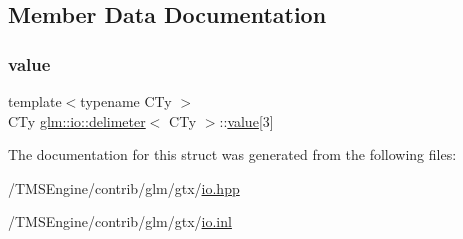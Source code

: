 \subsection{Member Data Documentation}
\mbox{\label{structglm_1_1io_1_1delimeter_a9ade129dae50c4f716f724e7425f9c68}} 
\subsubsection{\texorpdfstring{value}{value}}
{\footnotesize\ttfamily template$<$typename C\+Ty $>$ \\
C\+Ty \hyperlink{structglm_1_1io_1_1delimeter}{glm\+::io\+::delimeter}$<$ C\+Ty $>$\+::\hyperlink{_s_d_l__opengl__glext_8h_a8ad81492d410ff2ac11f754f4042150f}{value}\mbox{[}3\mbox{]}}



The documentation for this struct was generated from the following files\+:\begin{DoxyCompactItemize}
\item 
/\+T\+M\+S\+Engine/contrib/glm/gtx/\hyperlink{io_8hpp}{io.\+hpp}\item 
/\+T\+M\+S\+Engine/contrib/glm/gtx/\hyperlink{io_8inl}{io.\+inl}\end{DoxyCompactItemize}
